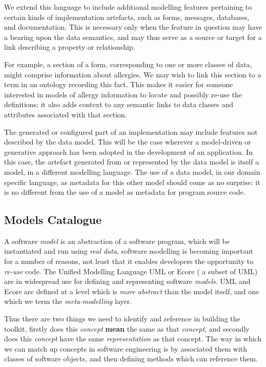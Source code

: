 We extend this language to include additional modelling features
pertaining to certain kinds of implementation artefacts, such as
forms, messages, databases, and documentation.  This is necessary only
when the feature in question may have a bearing upon the data
semantics, and may thus serve as a source or target for a link
describing a property or relationship.  

For example, a section of a form, corresponding to one or more classes
of data, might comprise information about allergies.  We may wish to
link this section to a term in an ontology recording this fact.  This
makes it easier for someone interested in models of allergy
information to locate and possibly re-use the definitions; it also
adds context to any semantic links to data classes and attributes
associated with that section.

The generated or configured part of an implementation may include
features not described by the data model.  This will be the case
wherever a model-driven or generative approach has been adopted in the
development of an application.  In this case, the artefact generated
from or represented by the data model is itself a model, in a
different modelling language.  The use of a data model, in our domain
specific language, as metadata for this other model should come as no
surprise: it is no different from the use of a model as metadata for
program source code. 

\subsection{Models Catalogue}

A software \emph{model} is an abstraction of a software program, which
will be instantiated and run using \emph{real data}, software
modelling is becoming important for a number of reasons, not least
that it enables developers the opportunity to \emph{re-use} code. The
Unified Modelling Language UML \cite{UML} or Ecore \cite{ECORE} ( a
subset of UML) are in widespread use for defining and representing
software \emph{models}. UML and Ecore are defined at a level which is
\emph{more abstract} than the model itself, and one which we term the
\emph{meta-modelling} layer.

Thus there are two things we need to identify and reference in
building the toolkit, firstly does this \emph{concept} \textbf{mean}
the same as that \emph{concept}, and secondly does this \emph{concept}
have the same \emph{representation} as that concept. The way in which
we can match up concepts in software engineering is by associated them
with classes of software objects, and then defining methods which can
reference them.

